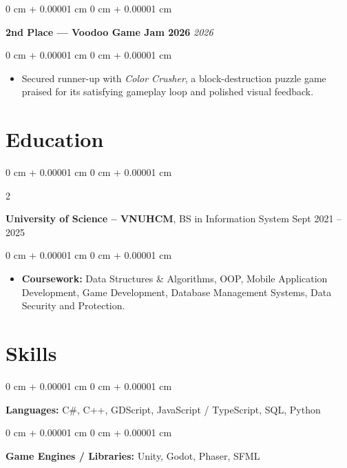 \documentclass[10pt, letterpaper]{article}
\newenvironment{highlights}{
    \begin{itemize}[
        topsep=0.10 cm,
        parsep=0.10 cm,
        partopsep=0pt,
        itemsep=0pt,
        leftmargin=0 cm + 10pt
    ]
}{
    \end{itemize}
} %
\newenvironment{onecolentry}{
    \begin{adjustwidth}{
        0 cm + 0.00001 cm
    }{
        0 cm + 0.00001 cm
    }
}{
    \end{adjustwidth}
} %
\newenvironment{twocolentry}[2][]{
    \onecolentry
    \def\secondColumn{#2}
    \setcolumnwidth{\fill, 4.5 cm}
    \begin{paracol}{2}
}{
    \switchcolumn \raggedleft \secondColumn
    \end{paracol}
    \endonecolentry
} %
\begin{document}
        \begin{onecolentry}
            \textbf{2nd Place — Voodoo Game Jam 2026} \hfill \textit{2026}
        \end{onecolentry}
        \vspace{0.10 cm}
        \begin{onecolentry}
            \begin{highlights}
                \item Secured runner-up with \textit{Color Crusher}, a block-destruction puzzle game praised for its satisfying gameplay loop and polished visual feedback.
            \end{highlights}
        \end{onecolentry}


    \section{Education}

        \begin{twocolentry}{
            Sept 2021 -- 2025
        }
            \textbf{University of Science -- VNUHCM}, BS in Information System\end{twocolentry}

        \vspace{0.10 cm}
        \begin{onecolentry}
            \begin{highlights}
                \item \textbf{Coursework:} Data Structures \& Algorithms, OOP, Mobile Application Development, Game Development, Database Management Systems, Data Security and Protection.
            \end{highlights}
        \end{onecolentry}


    \section{Skills}

        \begin{onecolentry}
            \textbf{Languages:} C\#, C++, GDScript, JavaScript / TypeScript, SQL, Python
        \end{onecolentry}

        \vspace{0.2 cm}

        \begin{onecolentry}
            \textbf{Game Engines / Libraries:} Unity, Godot, Phaser, SFML
        \end{onecolentry}
\end{document}
